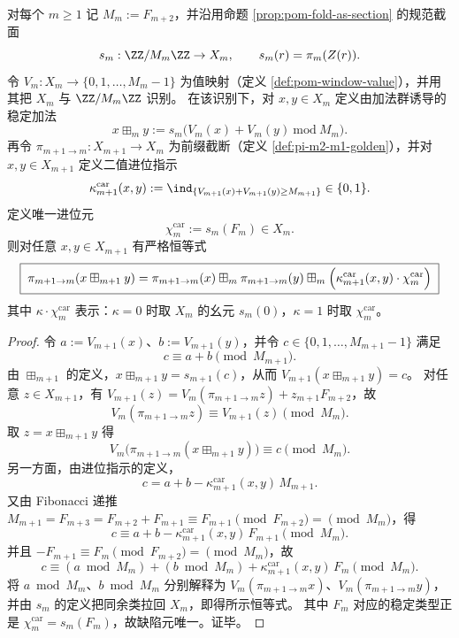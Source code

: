 \begin{theorem}[稳定类型同余半环上的降阶加法缺陷与唯一进位元]\label{thm:pom-stable-addition-carry-defect-unique-element}
对每个 \(m\ge 1\) 记 \(M_m:=F_{m+2}\)，并沿用命题 \ref{prop:pom-fold-as-section} 的规范截面
\[
s_m:\ZZ/M_m\ZZ\to X_m,\qquad s_m(r)=\pi_m(Z(r)).
\]
令 \(V_m:X_m\to\{0,1,\dots,M_m-1\}\) 为值映射（定义 \ref{def:pom-window-value}），并用其把 \(X_m\) 与 \(\ZZ/M_m\ZZ\) 识别。
在该识别下，对 \(x,y\in X_m\) 定义由加法群诱导的稳定加法
\[
x\boxplus_m y
:=
s_m\bigl(V_m(x)+V_m(y)\ \mathrm{mod}\ M_m\bigr).
\]
再令 \(\pi_{m+1\to m}:X_{m+1}\to X_m\) 为前缀截断（定义 \ref{def:pi-m2-m1-golden}），并对 \(x,y\in X_{m+1}\) 定义二值进位指示
\[
\kappa^{\mathrm{car}}_{m+1}(x,y)
:=\ind_{\{V_{m+1}(x)+V_{m+1}(y)\ge M_{m+1}\}}\in\{0,1\}.
\]
定义唯一进位元
\[
\chi^{\mathrm{car}}_m:=s_m(F_m)\in X_m.
\]
则对任意 \(x,y\in X_{m+1}\) 有严格恒等式
\[
\boxed{\;
\pi_{m+1\to m}(x\boxplus_{m+1}y)
=
\pi_{m+1\to m}(x)\boxplus_m \pi_{m+1\to m}(y)\boxplus_m\Bigl(\kappa^{\mathrm{car}}_{m+1}(x,y)\cdot \chi^{\mathrm{car}}_m\Bigr)\;}
\]
其中 \(\kappa\cdot \chi^{\mathrm{car}}_m\) 表示：\(\kappa=0\) 时取 \(X_m\) 的幺元 \(s_m(0)\)，\(\kappa=1\) 时取 \(\chi^{\mathrm{car}}_m\)。
\end{theorem}
\begin{proof}
令 \(a:=V_{m+1}(x)\)、\(b:=V_{m+1}(y)\)，并令 \(c\in\{0,1,\dots,M_{m+1}-1\}\) 满足
\[
c\equiv a+b\pmod{M_{m+1}}.
\]
由 \(\boxplus_{m+1}\) 的定义，\(x\boxplus_{m+1}y=s_{m+1}(c)\)，从而
\(
V_{m+1}(x\boxplus_{m+1}y)=c
\)。
对任意 \(z\in X_{m+1}\)，有
\(
V_{m+1}(z)=V_m(\pi_{m+1\to m}z)+z_{m+1}F_{m+2}
\)，故
\[
V_m(\pi_{m+1\to m}z)\equiv V_{m+1}(z)\pmod{M_m}.
\]
取 \(z=x\boxplus_{m+1}y\) 得
\[
V_m\bigl(\pi_{m+1\to m}(x\boxplus_{m+1}y)\bigr)\equiv c\pmod{M_m}.
\]
另一方面，由进位指示的定义，
\[
c=a+b-\kappa^{\mathrm{car}}_{m+1}(x,y)\,M_{m+1}.
\]
又由 Fibonacci 递推 \(M_{m+1}=F_{m+3}=F_{m+2}+F_{m+1}\equiv F_{m+1}\pmod{F_{m+2}}=\pmod{M_m}\)，得
\[
c\equiv a+b-\kappa^{\mathrm{car}}_{m+1}(x,y)\,F_{m+1}\pmod{M_m}.
\]
并且 \(-F_{m+1}\equiv F_m\pmod{F_{m+2}}=\pmod{M_m}\)，故
\[
c\equiv (a\bmod M_m)+(b\bmod M_m)+\kappa^{\mathrm{car}}_{m+1}(x,y)\,F_m\pmod{M_m}.
\]
将 \(a\bmod M_m\)、\(b\bmod M_m\) 分别解释为 \(V_m(\pi_{m+1\to m}x)\)、\(V_m(\pi_{m+1\to m}y)\)，并由 \(s_m\) 的定义把同余类拉回 \(X_m\)，即得所示恒等式。
其中 \(F_m\) 对应的稳定类型正是 \(\chi^{\mathrm{car}}_m=s_m(F_m)\)，故缺陷元唯一。证毕。
\end{proof}

